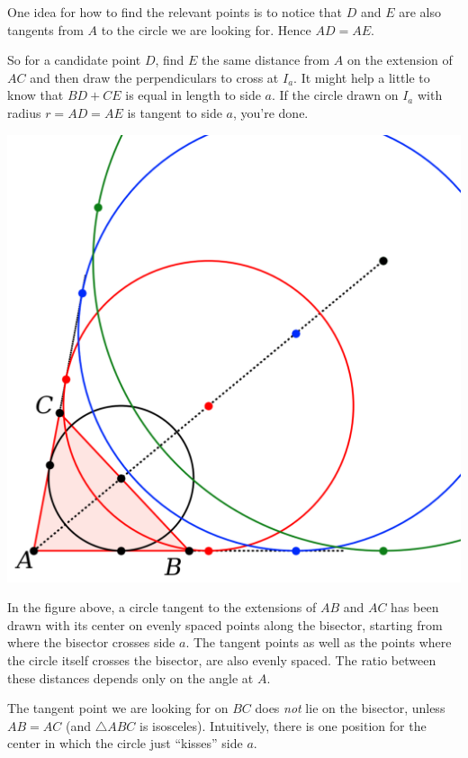 \documentclass[11pt, oneside]{article}
\begin{document}
One idea for how to find the relevant points is to notice that $D$ and $E$ are also tangents from $A$ to the circle we are looking for.  Hence $AD = AE$.  

So for a candidate point $D$, find $E$ the same distance from $A$ on the extension of $AC$ and then draw the perpendiculars to cross at $I_a$.  It might help a little to know that $BD + CE$ is equal in length to side $a$.  If the circle drawn on $I_a$ with radius $r = AD = AE$ is tangent to side $a$, you're done.  

\begin{center} \includegraphics [scale=0.40] {excircle_crop3.png} \end{center}

In the figure above, a circle tangent to the extensions of $AB$ and $AC$ has been drawn with its center on evenly spaced points along the bisector, starting from where the bisector crosses side $a$.  The tangent points as well as the points where the circle itself crosses the bisector, are also evenly spaced.  The ratio between these distances depends only on the angle at $A$.  

The tangent point we are looking for on $BC$ does \emph{not} lie on the bisector, unless $AB = AC$ (and $\triangle ABC$ is isosceles).  Intuitively, there is one position for the center in which the circle just ``kisses'' side $a$.
\end{document}
